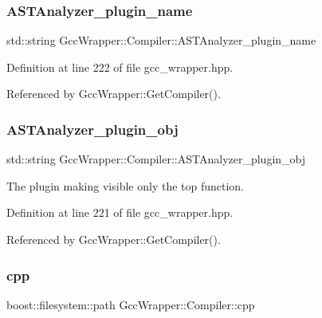 \subsubsection{\texorpdfstring{A\+S\+T\+Analyzer\+\_\+plugin\+\_\+name}{ASTAnalyzer\_plugin\_name}}
{\footnotesize\ttfamily std\+::string Gcc\+Wrapper\+::\+Compiler\+::\+A\+S\+T\+Analyzer\+\_\+plugin\+\_\+name}



Definition at line 222 of file gcc\+\_\+wrapper.\+hpp.



Referenced by Gcc\+Wrapper\+::\+Get\+Compiler().

\mbox{\label{classGccWrapper_1_1Compiler_a21da4c741100306fd078f064aa6f48dc}} 
\subsubsection{\texorpdfstring{A\+S\+T\+Analyzer\+\_\+plugin\+\_\+obj}{ASTAnalyzer\_plugin\_obj}}
{\footnotesize\ttfamily std\+::string Gcc\+Wrapper\+::\+Compiler\+::\+A\+S\+T\+Analyzer\+\_\+plugin\+\_\+obj}



The plugin making visible only the top function. 



Definition at line 221 of file gcc\+\_\+wrapper.\+hpp.



Referenced by Gcc\+Wrapper\+::\+Get\+Compiler().

\mbox{\label{classGccWrapper_1_1Compiler_a4e329ee75488399236f1defbb2499f1f}} 
\subsubsection{\texorpdfstring{cpp}{cpp}}
{\footnotesize\ttfamily boost\+::filesystem\+::path Gcc\+Wrapper\+::\+Compiler\+::cpp}



